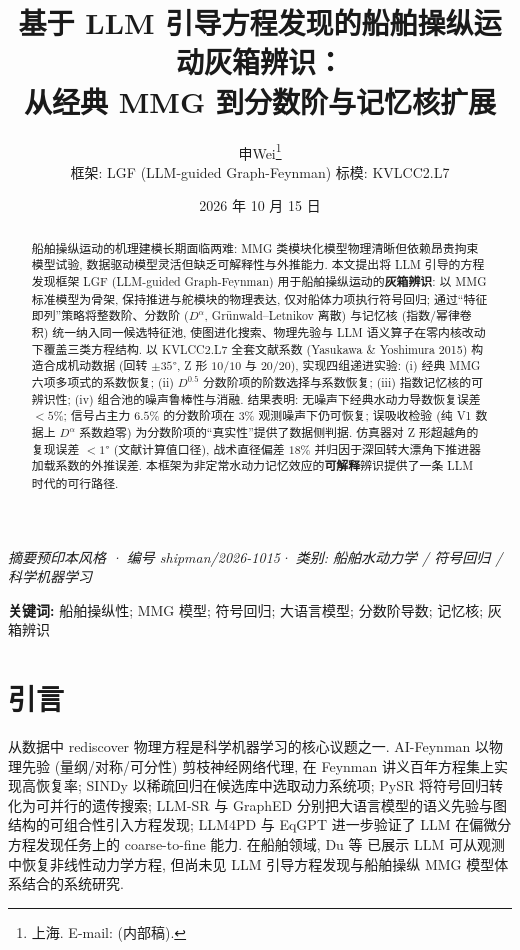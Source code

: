 \documentclass[12pt,a4paper]{ctexart}
\title{\textbf{基于 LLM 引导方程发现的船舶操纵运动灰箱辨识：\\[4pt] 从经典 MMG 到分数阶与记忆核扩展}}
\author{申\quad Wei\thanks{上海. E-mail: (内部稿).}\vspace{-2pt}\\[2pt]
{\small 框架: LGF (LLM-guided Graph-Feynman) \quad 标模: KVLCC2.L7}}
\date{2026 年 10 月 15 日}
\newcommand{\arxivnum}{shipman/2026-1015}
\begin{document}
\maketitle
\thispagestyle{fancy}
\begin{center}
{\small\itshape 摘要预印本风格 · 编号 \arxivnum · 类别: 船舶水动力学 / 符号回归 / 科学机器学习}
\end{center}
\vspace{-6pt}

\begin{abstract}
船舶操纵运动的机理建模长期面临两难: MMG 类模块化模型物理清晰但依赖昂贵拘束模型试验, 数据驱动模型灵活但缺乏可解释性与外推能力. 本文提出将 LLM 引导的方程发现框架 LGF (LLM-guided Graph-Feynman) 用于船舶操纵运动的\textbf{灰箱辨识}: 以 MMG 标准模型为骨架, 保持推进与舵模块的物理表达, 仅对船体力项执行符号回归; 通过``特征即列''策略将整数阶、分数阶 ($D^\alpha$, Grünwald--Letnikov 离散) 与记忆核 (指数/幂律卷积) 统一纳入同一候选特征池, 使图进化搜索、物理先验与 LLM 语义算子在零内核改动下覆盖三类方程结构. 以 KVLCC2.L7 全套文献系数 (Yasukawa \& Yoshimura 2015) 构造合成机动数据 (回转 $\pm35°$, Z 形 $10/10$ 与 $20/20$), 实现四组递进实验: (i) 经典 MMG 六项多项式的系数恢复; (ii) $D^{0.5}$ 分数阶项的阶数选择与系数恢复; (iii) 指数记忆核的可辨识性; (iv) 组合池的噪声鲁棒性与消融. 结果表明: 无噪声下经典水动力导数恢复误差 $<5\%$; 信号占主力 $6.5\%$ 的分数阶项在 $3\%$ 观测噪声下仍可恢复; 误吸收检验 (纯 V1 数据上 $D^\alpha$ 系数趋零) 为分数阶项的``真实性''提供了数据侧判据. 仿真器对 Z 形超越角的复现误差 $<1°$ (文献计算值口径), 战术直径偏差 $18\%$ 并归因于深回转大漂角下推进器加载系数的外推误差. 本框架为非定常水动力记忆效应的\textbf{可解释}辨识提供了一条 LLM 时代的可行路径.
\end{abstract}

\vspace{4pt}
\noindent\textbf{关键词:} 船舶操纵性; MMG 模型; 符号回归; 大语言模型; 分数阶导数; 记忆核; 灰箱辨识

\section{引言}
\label{sec:intro}

从数据中 rediscover 物理方程是科学机器学习的核心议题之一. AI-Feynman\cite{udrescu2020} 以物理先验 (量纲/对称/可分性) 剪枝神经网络代理, 在 Feynman 讲义百年方程集上实现高恢复率; SINDy\cite{brunton2016} 以稀疏回归在候选库中选取动力系统项; PySR\cite{cranmer2023} 将符号回归转化为可并行的遗传搜索; LLM-SR\cite{shojaee2024} 与 GraphED\cite{xu2026} 分别把大语言模型的语义先验与图结构的可组合性引入方程发现; LLM4PD\cite{luo2025} 与 EqGPT\cite{eqgpt2025} 进一步验证了 LLM 在偏微分方程发现任务上的 coarse-to-fine 能力. 在船舶领域, Du 等\cite{du2024} 已展示 LLM 可从观测中恢复非线性动力学方程, 但尚未见 LLM 引导方程发现与船舶操纵 MMG 模型体系结合的系统研究.
\end{document}

